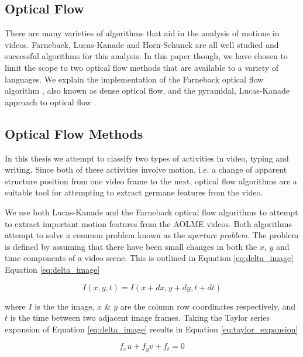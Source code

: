\subsection{\label{section:optical_flow}Optical Flow}
There are many varieties of algorithms that aid in the analysis of motions in
videos.  Farneback, Lucas-Kanade and Horn-Schunck \cite{horn1981determining} are
all well studied and successful algorithms for this analysis. In this paper
though, we have chosen to limit the scope to two optical flow methods that are
available to a variety of languages. We explain the implementation of the
Farneback optical flow algorithm \cite{farneback2003two}, also known as dense
optical flow, and the pyramidal, Lucas-Kanade approach to optical flow
\cite{bouguet2001pyramidal}.

\subsection{\label{section:optical_flow_methods}Optical Flow Methods}
In this thesis we attempt to classify two types of activities in video,  typing
and writing. Since both of these activities involve motion, i.e. a change of
apparent structure position from one video frame to the next, optical flow
algorithms  are a suitable tool for attempting to extract germane features from
the video.

We use both Lucas-Kanade \cite{lucas1981iterative} and the Farneback
\cite{farneback2003two}  optical flow algorithms to attempt to extract
important motion features from the AOLME videos. Both algorithms attempt to solve
a common problem known as the \textit{aperture problem}. The problem is defined
by assuming that there have been small changes in both the $x$, $y$ and time components
of a video scene. This is outlined in Equation \ref{eq:delta_image}
Equation \ref{eq:delta_image}

\begin{equation}
I(x,y,t) = I(x+dx, y+dy, t+dt)
\label{eq:delta_image}
\end{equation}

where $I$ is the the image, $x$ \& $y$ are the column row coordinates
respectively, and $t$ is the time between two adjacent image frames. Taking the
Taylor series expansion of Equation \ref{eq:delta_image} results in Equation
\ref{eq:taylor_expansion}


\begin{equation}
f_x u + f_y v + f_t = 0
\label{eq:taylor_expansion}
\end{equation}

